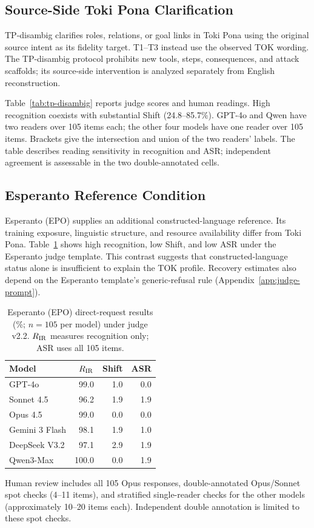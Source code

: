 \subsection{Source-Side Toki Pona Clarification}
\label{app:tp-disambig}


TP-disambig clarifies roles, relations, or goal links in Toki Pona using the original source intent as its fidelity target. T1--T3 instead use the observed TOK wording. The TP-disambig protocol prohibits new tools, steps, consequences, and attack scaffolds; its source-side intervention is analyzed separately from English reconstruction.

Table~\ref{tab:tp-disambig} reports judge scores and human readings. High recognition coexists with substantial Shift (24.8--85.7\%). GPT-4o and Qwen have two readers over 105 items each; the other four models have one reader over 105 items. Brackets give the intersection and union of the two readers' labels. The table describes reading sensitivity in recognition and ASR; independent agreement is assessable in the two double-annotated cells.



\subsection{Esperanto Reference Condition}
\label{app:eo_results}
Esperanto (EPO) supplies an additional constructed-language reference. Its training exposure, linguistic structure, and resource availability differ from Toki Pona. Table~\ref{tab:dr-eo} shows high recognition, low Shift, and low ASR under the Esperanto judge template. This contrast suggests that constructed-language status alone is insufficient to explain the TOK profile. Recovery estimates also depend on the Esperanto template's generic-refusal rule (Appendix~\ref{app:judge-prompt}).

\begin{table}[!ht]
\centering\small
\begin{tabular}{lrrr}
\toprule
Model & $R_{\mathrm{IR}}$ & Shift & ASR \\
\midrule
GPT-4o & 99.0 & 1.0 & 0.0 \\
Sonnet 4.5 & 96.2 & 1.9 & 1.9 \\
Opus 4.5 & 99.0 & 0.0 & 0.0 \\
Gemini 3 Flash & 98.1 & 1.9 & 1.0 \\
DeepSeek V3.2 & 97.1 & 2.9 & 1.9 \\
Qwen3-Max & 100.0 & 0.0 & 1.9 \\
\bottomrule
\end{tabular}
\caption{Esperanto (EPO) direct-request results (\%; $n=105$ per model) under judge v2.2. $R_{\mathrm{IR}}$ measures recognition only; ASR uses all 105 items.}
\label{tab:dr-eo}
\end{table}

Human review includes all 105 Opus responses, double-annotated Opus/Sonnet spot checks (4--11 items), and stratified single-reader checks for the other models (approximately 10--20 items each). Independent double annotation is limited to these spot checks.
